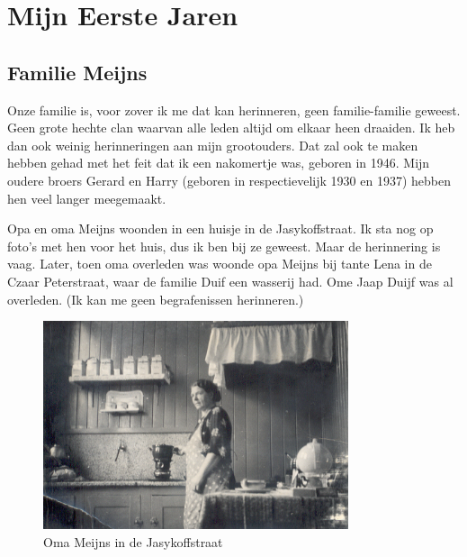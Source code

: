 \documentclass[12pt,twoside, openright]{memoir}
\begin{document}
\label{deel1}
\chapter{Mijn Eerste Jaren}



\thispagestyle{empty}
\section*{Familie Meijns} %
\label{cha:familie_meijns}


Onze familie is, voor zover ik me dat kan herinneren, geen familie-familie geweest. Geen grote hechte clan waarvan alle leden altijd om elkaar heen draaiden. Ik heb dan ook weinig herinneringen aan mijn grootouders. Dat zal ook te maken hebben gehad met het feit dat ik een nakomertje was, geboren in 1946. Mijn oudere broers Gerard en Harry (geboren in respectievelijk 1930 en 1937) hebben hen veel langer meegemaakt. 

Opa en oma Meijns woonden in een huisje in de Jasykoffstraat. Ik sta nog op foto’s met hen voor het huis, dus ik ben bij ze geweest. Maar de herinnering is vaag. Later, toen oma overleden was woonde opa Meijns bij tante Lena in de Czaar Peterstraat, waar de familie Duif een wasserij had. Ome Jaap Duijf was al overleden. (Ik kan me geen begrafenissen herinneren.)

\begin{figure}
\includegraphics[width=0.8\textwidth]{img/ch1/omaJasykofstr}
\centering
\caption*{\footnotesize Oma Meijns in de Jasykoffstraat}
\end{figure}
\end{document}
